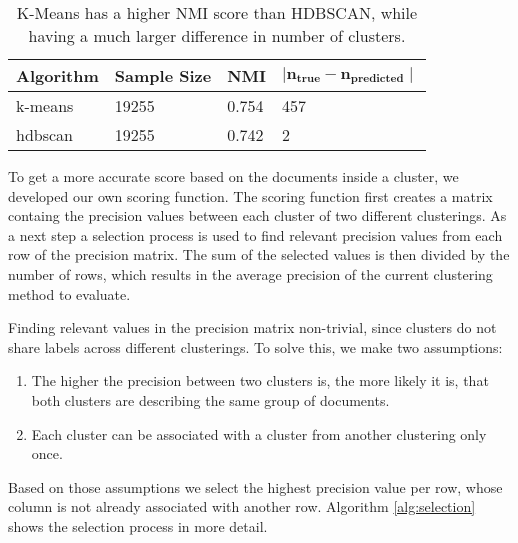 
\begin{table}[h]
    \centering
    \begin{tabular}{|l|l|l|l|}
    \hline
    \textbf{Algorithm} & \textbf{Sample Size} & \textbf{NMI}  & $\mathbf{ \mid n_{true} - n_{predicted} \mid }$ \\ \hline
    k-means & 19255 & 0.754 & 457 \\ \hline
    hdbscan & 19255 & 0.742 & 2 \\ \hline
    \end{tabular}
    \caption{K-Means has a higher NMI score than HDBSCAN, while having a much larger difference in number of clusters.}
    \label{tab:nmi_kmeans_example}
\end{table}

To get a more accurate score based on the documents inside a cluster, we developed our own scoring function. The scoring function first creates a matrix containg the precision values between each cluster of two different clusterings. As a next step a selection process is used to find relevant precision values from each row of the precision matrix. The sum of the selected values is then divided by the number of rows, which results in the average precision of the current clustering method to evaluate.  

Finding relevant values in the precision matrix non-trivial, since clusters do not share labels across different clusterings. To solve this, we make two assumptions:
\begin{enumerate} 
\item The higher the precision between two clusters is, the more likely it is, that both clusters are describing the same group of documents. 
\item Each cluster can be associated with a cluster from another clustering only once.
\end{enumerate}

Based on those assumptions we select the highest precision value per row, whose column is not already associated with another row. Algorithm \ref{alg:selection} shows the selection process in more detail. 


